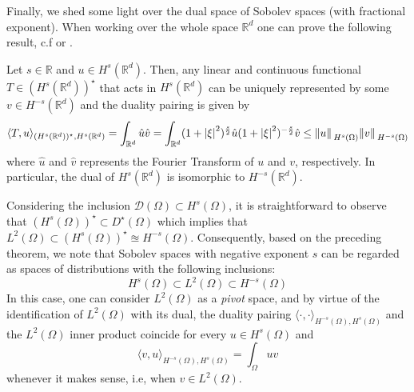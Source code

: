 Finally, we shed some light over the dual space of Sobolev spaces (with fractional exponent). When working over the whole space \(\mathbb{R}^d\) one can prove the following result, c.f \cite{chen2010boundary} or \cite{hormander2015analysis}.
\begin{theorem}
    Let \(s \in \mathbb{R}\) and \(u \in H^s(\mathbb{R}^d)\). Then, any linear and continuous functional \(T \in (H^s(\mathbb{R}^d))^\star\) that acts in \(H^s(\mathbb{R}^d)\) can be uniquely represented by some \(v \in H^{-s}(\mathbb{R}^d)\) and the duality pairing is given by
    \[
        \langle T, u \rangle_{(H^s(\mathbb{R}^d))^\star, H^s(\mathbb{R}^d)} = \int_{\mathbb{R}^d} \hat{u}\hat{v} = \int_{\mathbb{R}^d} (1+ \abs{\xi}^2)^{\frac{s}{2}}\hat{u}(1+ \abs{\xi}^{2})^{-\frac{s}{2}}\hat{v} \leq \norm*{u}_{H^s(\Omega)}\norm*{v}_{H^{-s}(\Omega)}
    \]
    where \(\hat{u}\) and \(\hat{v}\) represents the Fourier Transform of \(u\) and \(v\), respectively. In particular, the dual of \(H^s(\mathbb{R}^d)\) is isomorphic to \(H^{-s}(\mathbb{R}^d)\).
\end{theorem}
\begin{remark}
    Considering the inclusion \(\mathcal{D}(\Omega) \subset H^s(\Omega)\), it is straightforward to observe that \((H^s(\Omega))^\star \subset D^\star(\Omega)\) which implies that \(L^2(\Omega) \subset (H^{s}(\Omega))^\star \approxeq H^{-s}(\Omega)\). Consequently, based on the preceding theorem, we note that Sobolev spaces with negative exponent \(s\) can be regarded as spaces of distributions with the following inclusions:
    \[
        H^{s}(\Omega) \subset L^2(\Omega) \subset H^{-s}(\Omega)
    \]
    In this case, one can consider \(L^2(\Omega)\) as a \textit{pivot} space, and by virtue of the identification of \(L^2(\Omega)\) with its dual, the duality pairing \(\langle \cdot, \cdot \rangle_{H^{-s}(\Omega), H^s(\Omega)}\) and the \(L^2(\Omega)\) inner product coincide for every \(u \in H^s(\Omega)\) and
    \[
        \langle v, u \rangle_{H^{-s}(\Omega), H^s(\Omega)} = \int_{\Omega} u v
    \]
    whenever it makes sense, i.e, when \(v \in L^2(\Omega)\).
\end{remark}

